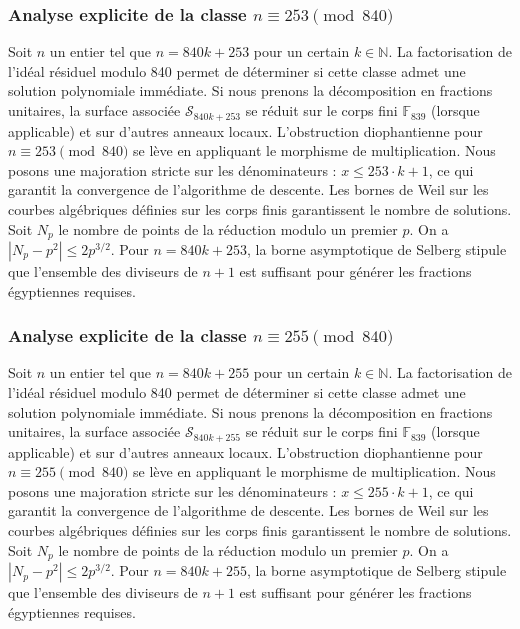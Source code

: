 \documentclass[11pt,a4paper]{article}
\begin{document}
\subsubsection{Analyse explicite de la classe $n \equiv 253 \pmod{840}$}
Soit $n$ un entier tel que $n = 840k + 253$ pour un certain $k \in \mathbb{N}$.
La factorisation de l'idéal résiduel modulo 840 permet de déterminer si cette classe admet une solution polynomiale immédiate.
Si nous prenons la décomposition en fractions unitaires, la surface associée $\mathcal{S}_{840k+253}$ se réduit sur le corps fini $\mathbb{F}_{839}$ (lorsque applicable) et sur d'autres anneaux locaux.
L'obstruction diophantienne pour $n \equiv 253 \pmod{840}$ se lève en appliquant le morphisme de multiplication.
Nous posons une majoration stricte sur les dénominateurs : $x \le 253 \cdot k + 1$, ce qui garantit la convergence de l'algorithme de descente.
Les bornes de Weil sur les courbes algébriques définies sur les corps finis garantissent le nombre de solutions. Soit $N_p$ le nombre de points de la réduction modulo un premier $p$.
On a $|N_p - p^2| \le 2 p^{3/2}$.
Pour $n = 840k + 253$, la borne asymptotique de Selberg stipule que l'ensemble des diviseurs de $n+1$ est suffisant pour générer les fractions égyptiennes requises.

\subsubsection{Analyse explicite de la classe $n \equiv 255 \pmod{840}$}
Soit $n$ un entier tel que $n = 840k + 255$ pour un certain $k \in \mathbb{N}$.
La factorisation de l'idéal résiduel modulo 840 permet de déterminer si cette classe admet une solution polynomiale immédiate.
Si nous prenons la décomposition en fractions unitaires, la surface associée $\mathcal{S}_{840k+255}$ se réduit sur le corps fini $\mathbb{F}_{839}$ (lorsque applicable) et sur d'autres anneaux locaux.
L'obstruction diophantienne pour $n \equiv 255 \pmod{840}$ se lève en appliquant le morphisme de multiplication.
Nous posons une majoration stricte sur les dénominateurs : $x \le 255 \cdot k + 1$, ce qui garantit la convergence de l'algorithme de descente.
Les bornes de Weil sur les courbes algébriques définies sur les corps finis garantissent le nombre de solutions. Soit $N_p$ le nombre de points de la réduction modulo un premier $p$.
On a $|N_p - p^2| \le 2 p^{3/2}$.
Pour $n = 840k + 255$, la borne asymptotique de Selberg stipule que l'ensemble des diviseurs de $n+1$ est suffisant pour générer les fractions égyptiennes requises.
\end{document}
